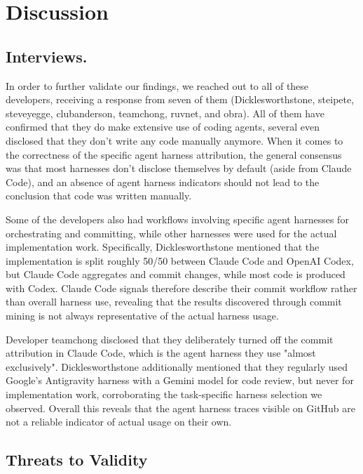 \documentclass[smallextended]{svjour3}
\begin{document}
\section{Discussion}
\label{sec:discussion}

\subsection{Interviews.}
In order to further validate our findings, we reached out to all of these developers, receiving a response from seven of them (Dicklesworthstone, steipete, steveyegge, clubanderson, teamchong, ruvnet, and obra). All of them have confirmed that they do make extensive use of coding agents, several even disclosed that they don't write any code manually anymore.
When it comes to the correctness of the specific agent harness attribution, the general consensus was that most harnesses don't disclose themselves by default (aside from Claude Code), and an absence of agent harness indicators should not lead to the conclusion that code was written manually.

Some of the developers also had workflows involving specific agent harnesses for orchestrating and committing, while other harnesses were used for the actual implementation work. Specifically, Dicklesworthstone mentioned that the implementation is split roughly 50/50 between Claude Code and OpenAI Codex, but Claude Code aggregates and commit changes, while most code is produced with Codex. Claude Code signals therefore describe their commit workflow rather than overall harness use, revealing that the results discovered through commit mining is not always representative of the actual harness usage.

Developer teamchong disclosed that they deliberately turned off the commit attribution in Claude Code, which is the agent harness they use "almost exclusively".
Dicklesworthstone additionally mentioned that they regularly used Google's Antigravity harness with a Gemini model for code review, but never for implementation work, corroborating the task-specific harness selection we observed.
Overall this reveals that the agent harness traces visible on GitHub are not a reliable indicator of actual usage on their own.

\subsection{Threats to Validity}
\end{document}
